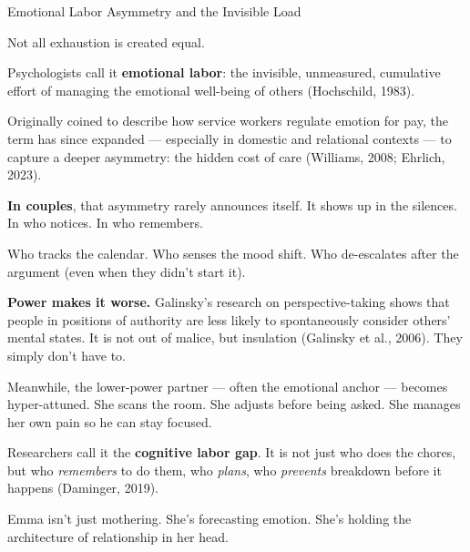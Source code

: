 \begin{PsychologicalSidebar}{Emotional Labor Asymmetry and the Invisible Load}

  Not all exhaustion is created equal.
  
  \medskip
  
  Psychologists call it \textbf{emotional labor}: the invisible, unmeasured, cumulative effort 
  of managing the emotional well-being of others (Hochschild, 1983).
  
  \medskip
  
  Originally coined to describe how service workers regulate emotion for pay, the term has since 
  expanded --- especially in domestic and relational contexts --- to capture a deeper asymmetry:
  the hidden cost of care (Williams, 2008; Ehrlich, 2023).
  
  \medskip
  
  \textbf{In couples}, that asymmetry rarely announces itself.  
  It shows up in the silences.  
  In who notices.  
  In who remembers.
  
  \medskip
  
  Who tracks the calendar.  
  Who senses the mood shift.  
  Who de-escalates after the argument (even when they didn’t start it).
  
  \medskip
  
  \textbf{Power makes it worse.}  
  Galinsky’s research on perspective-taking shows that people in positions of authority are less likely 
  to spontaneously consider others’ mental states. It is not out of malice, but insulation (Galinsky et al., 2006).  
  They simply don’t have to.
  
  \medskip
  
  Meanwhile, the lower-power partner --- often the emotional anchor --- becomes hyper-attuned.  
  She scans the room.  
  She adjusts before being asked.  
  She manages her own pain so he can stay focused.
  
  \medskip
  
  Researchers call it the \textbf{cognitive labor gap}. It is not just who does the chores, 
  but who \textit{remembers} to do them, who \textit{plans}, who \textit{prevents} breakdown before it 
  happens (Daminger, 2019).
  
  \medskip
  
  Emma isn’t just mothering.  
  She’s forecasting emotion.  
  She’s holding the architecture of relationship in her head.
  
  \medskip
  

\end{PsychologicalSidebar}
